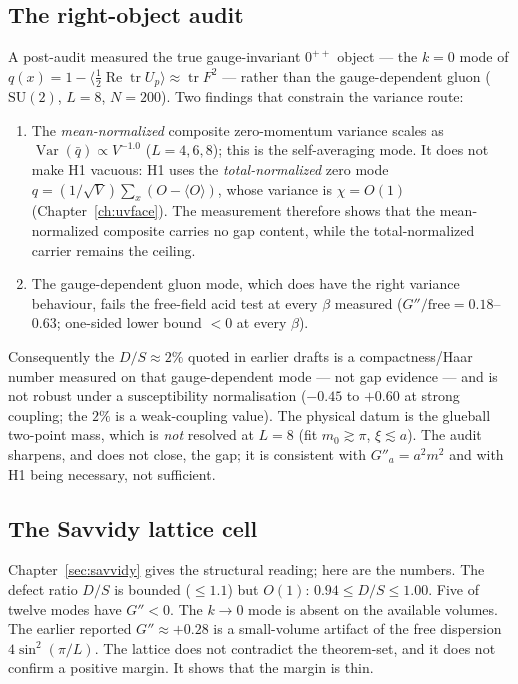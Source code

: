 \figprobe

\subsection{The right-object audit}

A post-audit measured the true gauge-invariant $0^{++}$ object --- the $k=0$ mode of
$q(x)=1-\langle\tfrac12\operatorname{Re}\operatorname{tr}U_p\rangle\approx\operatorname{tr}F^2$
--- rather than the gauge-dependent gluon ($\mathrm{SU}(2)$, $L=8$, $N=200$). Two findings that
constrain the variance route:
\begin{enumerate}
\item The \emph{mean-normalized} composite zero-momentum variance scales as
  $\operatorname{Var}(\bar q)\propto V^{-1.0}$ ($L=4,6,8$); this is the self-averaging mode. It does
  not make H1 vacuous: H1 uses the \emph{total-normalized} zero mode
  $q=(1/\sqrt V)\sum_x(O-\langle O\rangle)$, whose variance is $\chi=O(1)$ (Chapter~\ref{ch:uvface}).
  The measurement therefore shows that the mean-normalized composite carries no gap content, while
  the total-normalized carrier remains the ceiling.
\item The gauge-dependent gluon mode, which does have the right variance behaviour, fails the
  free-field acid test at every $\beta$ measured ($G''/\text{free}=0.18$--$0.63$; one-sided lower
  bound $<0$ at every $\beta$).
\end{enumerate}
Consequently the $D/S\approx2\%$ quoted in earlier drafts is a compactness/Haar number measured
on that gauge-dependent mode --- not gap evidence --- and is not robust under a susceptibility
normalisation ($-0.45$ to $+0.60$ at strong coupling; the $2\%$ is a weak-coupling value). The
physical datum is the glueball two-point mass, which is \emph{not} resolved at $L=8$ (fit
$m_0\gtrsim\pi$, $\xi\lesssim a$). The audit sharpens, and does not close, the gap; it is
consistent with $G''_a=a^2m^2$ and with H1 being necessary, not sufficient.

\subsection{The Savvidy lattice cell}

Chapter~\ref{sec:savvidy} gives the structural reading; here are the numbers. The defect ratio
$D/S$ is bounded ($\le1.1$) but $O(1)$: $0.94\le D/S\le1.00$. Five of twelve modes have $G''<0$.
The $k\to0$ mode is absent on the available volumes. The earlier reported $G''\approx+0.28$ is a
small-volume artifact of the free dispersion $4\sin^2(\pi/L)$. The lattice does not contradict
the theorem-set, and it does not confirm a positive margin. It shows that the margin is thin.

